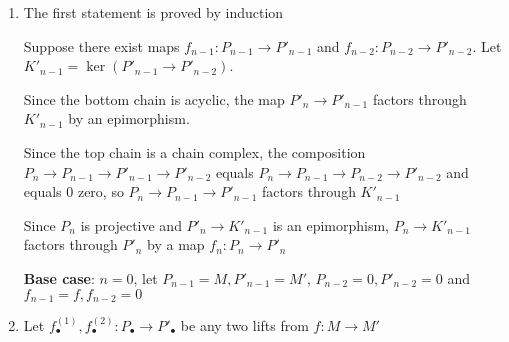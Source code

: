 \begin{longproof}
	\begin{enumerate}
		\item The first statement is proved by induction
		\begin{center}
		\end{center}
		
		Suppose there exist maps $f_{n-1}: P_{n-1} \to P'_{n-1}$ and $f_{n-2}: P_{n-2} \to P'_{n-2}$. Let $K'_{n-1} = \ker(P'_{n-1} \to P'_{n-2})$.
		
		Since the bottom chain is acyclic, the map $P'_n \to P'_{n-1}$ factors through $K'_{n-1}$ by an epimorphism.
		
		Since the top chain is a chain complex, the composition $P_n \to P_{n-1} \to P'_{n-1} \to P'_{n-2}$ equals $P_n \to P_{n-1} \to P_{n-2} \to P'_{n-2}$ and equals 0 zero, so $P_n \to P_{n-1} \to P'_{n-1}$ factors through $K'_{n-1}$
		
		Since $P_n$ is projective and $P'_n \to K'_{n-1}$ is an epimorphism, $P_n \to K'_{n-1}$ factors through $P'_n$ by a map $f_n: P_n \to P'_n$
		
		\textbf{Base case}: $n=0$, let $P_{n-1} = M, P'_{n-1} = M'$, $P_{n-2} = 0, P'_{n-2} = 0$ and $f_{n-1} = f, f_{n-2} = 0$
		
		\item Let $f^{(1)}_\bullet, f^{(2)}_\bullet: P_\bullet \to P'_\bullet$ be any two lifts from $f: M \to M'$
		
		\begin{center}
		\end{center}
		

\end{enumerate}
\end{longproof}
